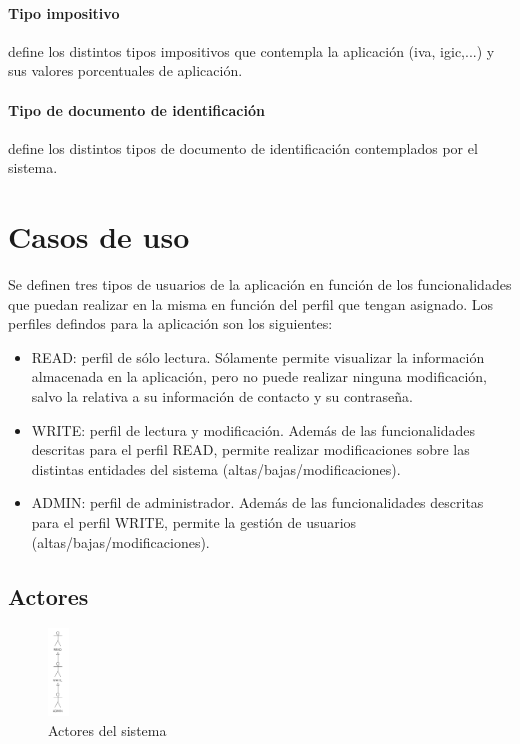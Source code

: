\paragraph{Tipo impositivo} define los distintos tipos impositivos que contempla la aplicación (iva, igic,...) y sus valores porcentuales de aplicación.
\paragraph{Tipo de documento de identificación} define los distintos tipos de documento de identificación contemplados por el sistema.



\section{Casos de uso}
\label{sec:casos de uso}

Se definen tres tipos de usuarios de la aplicación en función de los funcionalidades que puedan realizar en la misma en función del perfil que tengan asignado. Los perfiles defindos para la aplicación son los siguientes:

\begin{itemize}
\item READ: perfil de sólo lectura. Sólamente permite visualizar la información almacenada en la aplicación, pero no puede realizar ninguna modificación, salvo la relativa a su información de contacto y su contraseña.
\item WRITE: perfil de lectura y modificación. Además de las funcionalidades descritas para el perfil READ, permite realizar modificaciones sobre las distintas entidades del sistema (altas/bajas/modificaciones).
\item ADMIN: perfil de administrador. Además de las funcionalidades descritas para el perfil WRITE, permite la gestión de usuarios (altas/bajas/modificaciones).
\end{itemize}


\subsection{Actores}
\label{sub:actores}


\begin{figure}[hp!]
  \centering
  \includegraphics[width=0.05\textwidth]{imaxes/actores.png}
  \caption{Actores del sistema}
  \label{fig:actores}
\end{figure}

